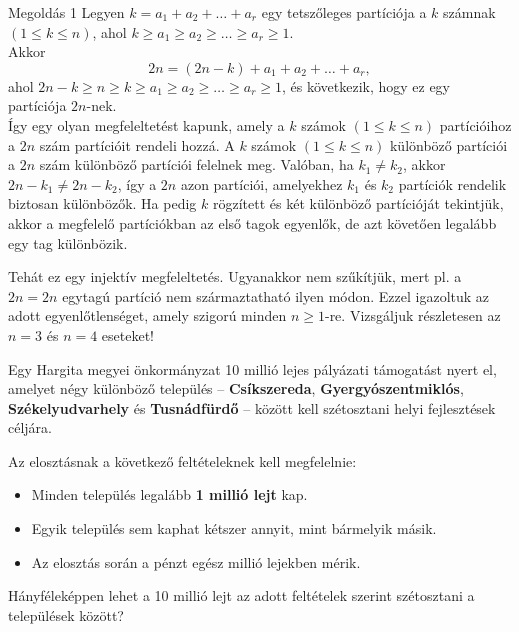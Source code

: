\begin{solution}
Megoldás 1 Legyen $k=a_{1}+a_{2}+\dots+a_{r}$ egy tetszőleges partíciója
a $k$ számnak $(1\leq k\leq n)$, ahol $k\geq a_{1}\geq a_{2}\geq\dots\geq a_{r}\geq1$.
\\
Akkor 
\[
2n=(2n-k)+a_{1}+a_{2}+\dots+a_{r},
\]
ahol $2n-k\geq n\geq k\geq a_{1}\geq a_{2}\geq\dots\geq a_{r}\geq1$,
és következik, hogy ez egy partíciója $2n$-nek. \\
Így egy olyan megfeleltetést kapunk, amely a $k$ számok $(1\leq k\leq n)$
partícióihoz a $2n$ szám partícióit rendeli hozzá. A $k$ számok
$(1\leq k\leq n)$ különböző partíciói a $2n$ szám különböző partíciói
felelnek meg. Valóban, ha $k_{1}\neq k_{2}$, akkor $2n-k_{1}\neq2n-k_{2}$,
így a $2n$ azon partíciói, amelyekhez $k_{1}$ és $k_{2}$ partíciók
rendelik biztosan különbözők. Ha pedig $k$ rögzített és két különböző
partícióját tekintjük, akkor a megfelelő partíciókban az első tagok
egyenlők, de azt követően legalább egy tag különbözik.

Tehát ez egy injektív megfeleltetés. Ugyanakkor nem szűkítjük, mert
pl. a $2n=2n$ egytagú partíció nem származtatható ilyen módon. Ezzel
igazoltuk az adott egyenlőtlenséget, amely szigorú minden $n\geq1$-re.
Vizsgáljuk részletesen az $n=3$ és $n=4$ eseteket! 
\end{solution}
\begin{extraproblem}
Egy Hargita megyei önkormányzat 10 millió lejes pályázati támogatást
nyert el, amelyet négy különböző település -- \textbf{Csíkszereda},
\textbf{Gyergyószentmiklós}, \textbf{Székelyudvarhely} és \textbf{Tusnádfürdő}
-- között kell szétosztani helyi fejlesztések céljára.

Az elosztásnak a következő feltételeknek kell megfelelnie:
\begin{itemize}
\item Minden település legalább \textbf{1 millió lejt} kap. 
\item Egyik település sem kaphat kétszer annyit, mint bármelyik másik. 
\item Az elosztás során a pénzt egész millió lejekben mérik. 
\end{itemize}
Hányféleképpen lehet a 10 millió lejt az adott feltételek szerint
szétosztani a települések között? 
\end{extraproblem}
